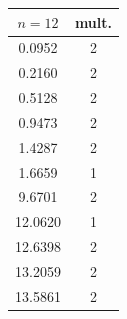 \documentclass[JEP,XML,SOM,Unicode,ThmDefs,NoFloatCountersInSection,published]{cedram}
\theoremstyle{plain}
\theoremstyle{definition}
\begin{document}
\begin{table}
\begin{minipage}{.2\textwidth}
\begin{tabular}{|c|c|}
\hline
$n = 12$ & mult.\\ \hline
0.0952& 2\\
0.2160& 2\\
0.5128& 2\\
0.9473& 2\\
1.4287& 2\\
1.6659& 1\\
9.6701& 2\\
12.0620& 1\\
12.6398& 2\\
13.2059& 2\\
13.5861& 2\\
\hline
\end{tabular}
\end{minipage}


\end{table}
\end{document}
